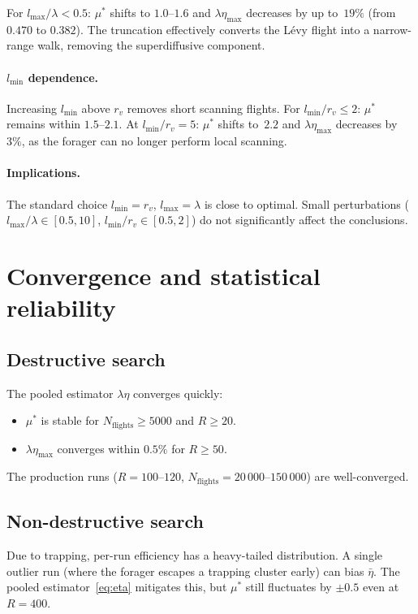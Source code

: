 For $l_{\max}/\lambda < 0.5$: $\mu^*$ shifts to $1.0$--$1.6$
and $\lambda\eta_{\max}$ decreases by up to~$19\%$ (from
$0.470$ to $0.382$).  The truncation effectively converts the
L\'evy flight into a narrow-range walk, removing the
superdiffusive component.

\paragraph{$l_{\min}$ dependence.}
Increasing $l_{\min}$ above $r_v$ removes short scanning
flights.  For $l_{\min}/r_v \leq 2$: $\mu^*$ remains within
$1.5$--$2.1$.  At $l_{\min}/r_v = 5$: $\mu^*$ shifts to~$2.2$
and $\lambda\eta_{\max}$ decreases by~$3\%$, as the forager
can no longer perform local scanning.

\paragraph{Implications.}
The standard choice $l_{\min} = r_v$, $l_{\max} = \lambda$ is
close to optimal.  Small perturbations ($l_{\max}/\lambda
\in [0.5, 10]$, $l_{\min}/r_v \in [0.5, 2]$) do not
significantly affect the conclusions.

\section{Convergence and statistical reliability}

\subsection{Destructive search}

The pooled estimator $\lambda\eta$ converges quickly:
\begin{itemize}
  \item $\mu^*$ is stable for $N_{\mathrm{flights}} \geq 5000$
        and $R \geq 20$.
  \item $\lambda\eta_{\max}$ converges within $0.5\%$ for
        $R \geq 50$.
\end{itemize}
The production runs ($R = 100$--$120$,
$N_{\mathrm{flights}} = 20\,000$--$150\,000$) are
well-converged.

\subsection{Non-destructive search}

Due to trapping, per-run efficiency has a heavy-tailed
distribution.  A single outlier run (where the forager
escapes a trapping cluster early) can bias $\bar\eta$.
The pooled estimator~\eqref{eq:eta} mitigates this, but
$\mu^*$ still fluctuates by $\pm 0.5$ even at $R = 400$.

